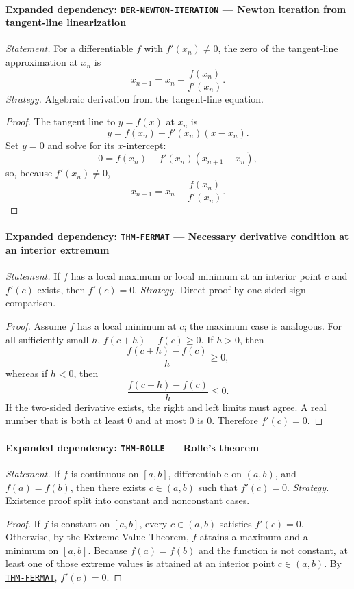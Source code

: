 \documentclass[10pt]{article}
\newcommand{\pidraw}[1]{\begingroup\urlstyle{tt}\nolinkurl{#1}\endgroup}
\newcommand{\pidref}[1]{\hyperref[prf:#1]{\pidraw{#1}}}
\newcommand{\pid}[1]{\pidref{#1}}
\theoremstyle{definition}
\theoremstyle{remark}
\begin{document}
\paragraph{Expanded dependency: \pidraw{DER-NEWTON-ITERATION} --- Newton iteration from tangent-line linearization}
\textit{Statement.} For a differentiable $f$ with $f'(x_n)\ne0$, the zero of the tangent-line approximation at $x_n$ is
\[
x_{n+1}=x_n-\frac{f(x_n)}{f'(x_n)}.
\]
\textit{Strategy.} Algebraic derivation from the tangent-line equation.
\begin{proof}The tangent line to $y=f(x)$ at $x_n$ is
\[
y=f(x_n)+f'(x_n)(x-x_n).
\]
Set $y=0$ and solve for its $x$-intercept:
\[
0=f(x_n)+f'(x_n)(x_{n+1}-x_n),
\]
so, because $f'(x_n)\ne0$,
\[
x_{n+1}=x_n-\frac{f(x_n)}{f'(x_n)}.
\]\end{proof}

\paragraph{Expanded dependency: \pidraw{THM-FERMAT} --- Necessary derivative condition at an interior extremum}
\textit{Statement.} If $f$ has a local maximum or local minimum at an interior point $c$ and $f'(c)$ exists, then $f'(c)=0$.
\textit{Strategy.} Direct proof by one-sided sign comparison.
\begin{proof}Assume $f$ has a local minimum at $c$; the maximum case is analogous.
For all sufficiently small $h$,
$f(c+h)-f(c)\ge0$. If $h>0$, then
\[
\frac{f(c+h)-f(c)}{h}\ge0,
\]
whereas if $h<0$, then
\[
\frac{f(c+h)-f(c)}{h}\le0.
\]
If the two-sided derivative exists, the right and left limits must agree.
A real number that is both at least $0$ and at most $0$ is $0$.
Therefore $f'(c)=0$.\end{proof}

\paragraph{Expanded dependency: \pidraw{THM-ROLLE} --- Rolle's theorem}
\textit{Statement.} If $f$ is continuous on $[a,b]$, differentiable on $(a,b)$, and $f(a)=f(b)$, then there exists $c\in(a,b)$ such that $f'(c)=0$.
\textit{Strategy.} Existence proof split into constant and nonconstant cases.
\begin{proof}If $f$ is constant on $[a,b]$, every $c\in(a,b)$ satisfies $f'(c)=0$.
Otherwise, by the Extreme Value Theorem, $f$ attains a maximum and a minimum
on $[a,b]$. Because $f(a)=f(b)$ and the function is not constant, at least one
of those extreme values is attained at an interior point $c\in(a,b)$.
By \pid{THM-FERMAT}, $f'(c)=0$.\end{proof}
\end{document}
